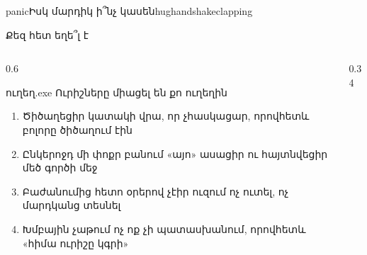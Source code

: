 
%
  {   }%
  {panic}{Իսկ մարդիկ ի՞նչ կասեն}{{hug}{handshake}{clapping}}

\begin{frame}{Քեզ հետ եղե՞լ է}
  \begin{columns}[c]
    \begin{column}{0.6\textwidth}
      \begin{popup}{ուղեղ.exe}
        {\blackfont\large Ուրիշները միացել են քո ուղեղին}\par\medskip
        \begin{enumerate}
          \item<2-> Ծիծաղեցիր կատակի վրա, որ չհասկացար, որովհետև բոլորը ծիծաղում էին
          \item<3-> Ընկերոջդ մի փոքր բանում «այո» ասացիր ու հայտնվեցիր մեծ գործի մեջ
          \item<4-> Բաժանումից հետո օրերով չէիր ուզում ոչ ուտել, ոչ մարդկանց տեսնել
          \item<5-> Խմբային չաթում ոչ ոք չի պատասխանում, որովհետև «հիմա ուրիշը կգրի»
        \end{enumerate}
      \end{popup}
    \end{column}
    \begin{column}{0.34\textwidth}
      \centering
      \par\medskip
    \end{column}
  \end{columns}
\end{frame}

